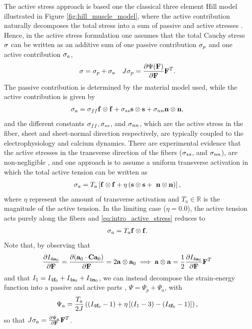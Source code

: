 The active stress approach is based one the classical three element
Hill model illustrated in Figure \ref{fig:hill_muscle_model}, where the
active contribution naturally decomposes the total stress into a sum
of passive and active stresses
\cite{nash2004electromechanical}. Hence, in the active stress
formulation \cite{hunter1998modelling} one assumes that the total
Cauchy stress $\mathbf{\sigma}$ can be written as an additive sum of one
passive contribution $\mathbf{\sigma}_p$ and one active contribution $\mathbf{\sigma}_a$,
\begin{align}
  \mathbf{\sigma} = \mathbf{\sigma}_p + \mathbf{\sigma}_a && J \mathbf{\sigma}_p =  \frac{\partial \Psi(\mathbf{F})}{\partial \mathbf{F}} \mathbf{F}^{T}.
\end{align}
The passive contribution is determined by the material model used,
while the active contribution is given by 
\begin{align}
  \mathbf{\sigma}_a = \mathbf{\sigma}_{ff} \mathbf{f} \otimes \mathbf{f} +
  \mathbf{\sigma}_{ss} \mathbf{s} \otimes \mathbf{s} +
  \mathbf{\sigma}_{nn} \mathbf{n} \otimes \mathbf{n},
\end{align}
and the different constants $\mathbf{\sigma}_{ff}, \mathbf{\sigma}_{ss}$, and
$\mathbf{\sigma}_{nn}$, which are the active stress in the fiber, sheet and
sheet-normal direction respectively, are typically coupled to the
electrophysiology and calcium dynamics.
There are experimental evidence that the active stresses in the
transverse direction of the fibers ($\mathbf{\sigma}_{ss}$, and $\mathbf{\sigma}_{nn}$),
are non-negligible \cite{lin1998multiaxial}, and one approach is to assume
a uniform transverse activation in which the total active tension
can be written as 
\begin{align}
  \mathbf{\sigma}_a = T_a \left[\mathbf{f} \otimes \mathbf{f} +
   \eta\left( \mathbf{s} \otimes \mathbf{s} +
  \ \mathbf{n} \otimes \mathbf{n} \right)\right],
  \label{eq:intro_active_stress}
\end{align}
where $\eta$ represent the amount of transverse activation and $T_a
\in \mathbb{R}$ is the magnitude of the active tension.
In the limiting case ($\eta = 0.0$), the active tension acts purely
along the fibers and \eqref{eq:intro_active_stress} reduces to 
\begin{align}
  \mathbf{\sigma}_a = T_a \mathbf{f} \otimes \mathbf{f}.
\end{align}
Note that, by observing  that
\begin{align*}
  \frac{\partial I_{4\mathbf{a}_0}}{\partial \mathbf{F}}
  = \frac{\partial (\mathbf{a}_0  \cdot \mathbf{C} \mathbf{a}_0 )}{\partial \mathbf{F}}
  = 2 \mathbf{a} \otimes \mathbf{a}_0 \implies
  \mathbf{a} \otimes  \mathbf{a}= \frac{1}{2} \frac{\partial I_{4\mathbf{a}_0}}{\partial \mathbf{F}} \mathbf{F}^{T}
\end{align*}
and that $I_1 =  I_{4\mathbf{f}_0} +  I_{4\mathbf{s}_0} +  I_{4\mathbf{n}_0}$, 
we can instead decompose the strain-energy function into a passive and active
parts \cite{pathmanathan2010cardiac}, $\Psi= \Psi_p + \Psi_a$, with
\begin{align}
\Psi_a = \frac{T_a}{2J} \left(( I_{4\mathbf{f}_0} - 1)  + \eta \left[ (I_1 - 3) -
    (I_{4\mathbf{f}_0} - 1)\right] \right), 
\end{align}
so that $J \mathbf{\sigma}_a  = \frac{\partial \Psi_a}{\partial \mathbf{F}}
\mathbf{F}^{T}$.

